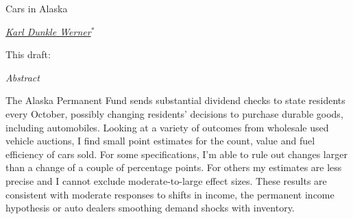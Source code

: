 \documentclass[11pt,letterpaper,oneside]{article}
\begin{document}
\thispagestyle{empty}
\setcounter{page}{0}
\vspace*{0.7in plus 0.3in minus 0.3in}

\begin{center}
    {\Huge Cars in Alaska}

    \href{mailto:karldw@berkeley.edu}{\textit{\Large Karl Dunkle Werner}}$^*$

\vspace{1em}
    This draft:  \gitCommitterDate{}
\end{center}

\vspace{2in plus 1in minus 0.7in}

\begin{center}
    \begin{minipage}{0.7\linewidth}
        \begin{center}
            \textit{Abstract}
        \end{center}
        The Alaska Permanent Fund sends substantial dividend checks to state residents every October, possibly changing residents' decisions to purchase durable goods, including automobiles.
        Looking at a variety of outcomes from wholesale used vehicle auctions, I find small point estimates for the count, value and fuel efficiency of cars sold.
        For some specifications, I'm able to rule out changes larger than a change of a couple of percentage points.
        For others my estimates are less precise and I cannot exclude moderate-to-large effect sizes.
        These results are consistent with moderate responses to shifts in income, the permanent income hypothesis or auto dealers smoothing demand shocks with inventory.
    \end{minipage}
\end{center}
\end{document}
